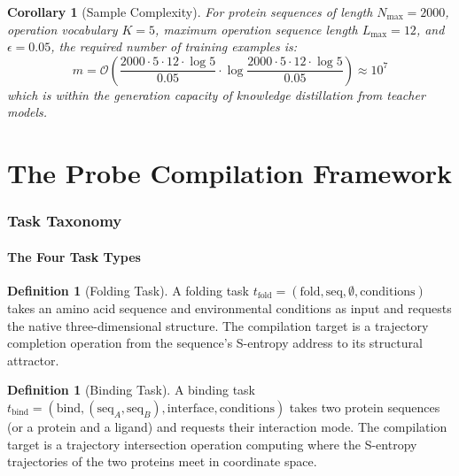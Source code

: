 \documentclass[11pt,twocolumn,a4paper]{article}
\newtheorem{corollary}[theorem]{Corollary}
\theoremstyle{definition}
\newtheorem{definition}[theorem]{Definition}
\theoremstyle{remark}
\begin{document}
\begin{corollary}[Sample Complexity]
\label{cor:sample_complexity}
For protein sequences of length $N_{\max} = 2000$, operation vocabulary $K = 5$, maximum operation sequence length $L_{\max} = 12$, and $\epsilon = 0.05$, the required number of training examples is:
\begin{equation}
m = \mathcal{O}\left(\frac{2000 \cdot 5 \cdot 12 \cdot \log 5}{0.05} \cdot \log \frac{2000 \cdot 5 \cdot 12 \cdot \log 5}{0.05}\right) \approx 10^7
\end{equation}
which is within the generation capacity of knowledge distillation from teacher models.
\end{corollary}

\part{The Probe Compilation Framework}

\section{Task Taxonomy}
\label{sec:task_taxonomy}

\subsection{The Four Task Types}

\begin{definition}[Folding Task]
\label{def:folding_task}
A folding task $t_{\text{fold}} = (\text{fold}, \text{seq}, \emptyset, \text{conditions})$ takes an amino acid sequence and environmental conditions as input and requests the native three-dimensional structure. The compilation target is a trajectory completion operation from the sequence's S-entropy address to its structural attractor.
\end{definition}

\begin{definition}[Binding Task]
\label{def:binding_task}
A binding task $t_{\text{bind}} = (\text{bind}, (\text{seq}_A, \text{seq}_B), \text{interface}, \text{conditions})$ takes two protein sequences (or a protein and a ligand) and requests their interaction mode. The compilation target is a trajectory intersection operation computing where the S-entropy trajectories of the two proteins meet in coordinate space.
\end{definition}
\end{document}
